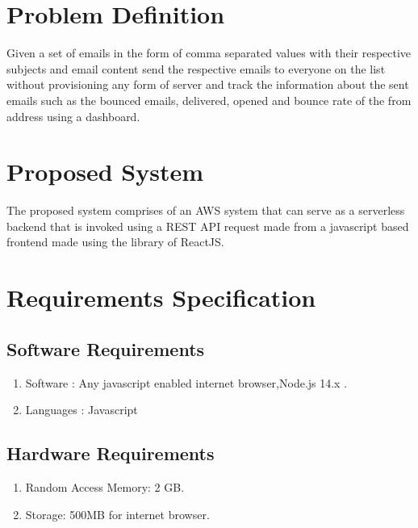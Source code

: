 \newpage

\section{Problem Definition}

Given a set of emails in the form of comma separated values with their respective subjects and email content send the respective emails to everyone on the list without provisioning any form of server and track the information about the sent emails such as the bounced emails, delivered, opened and bounce rate of the from address using a dashboard.


\section{Proposed System}

The proposed system comprises of an AWS system that can serve as a serverless backend that is invoked using a REST API request made from a javascript based frontend made using the library of ReactJS.




\section{Requirements Specification}
\subsection{Software Requirements}
\begin{enumerate}
    \item Software : Any javascript enabled internet browser,Node.js 14.x .
    \item Languages : Javascript
\end{enumerate}


\subsection{Hardware Requirements}
\begin{enumerate}
    \item Random Access Memory: 2 GB.
    \item Storage: 500MB for internet browser.
\end{enumerate}
